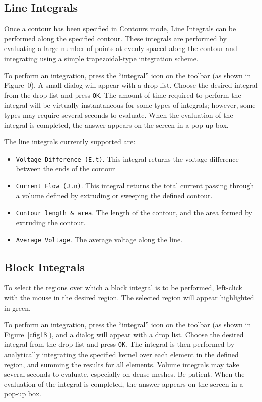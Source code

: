 \subsection{Line Integrals}

Once a contour has been specified in Contours mode, Line Integrals can be
performed along the specified contour. These integrals are performed by
evaluating a large number of points at evenly spaced along the contour and
integrating using a simple trapezoidal-type integration scheme.

To perform an integration, press the ``integral'' icon on the
toolbar (as shown in Figure~0). A small dialog will appear with a
drop list. Choose the desired integral from the drop list and press
\texttt{OK}. The amount of time required to perform the integral
will be virtually instantaneous for some types of integrals;
however, some types may require several seconds to evaluate. When
the evaluation of the integral is completed, the answer appears on
the screen in a pop-up box.

The line integrals currently supported are:

\begin{itemize}
\item \texttt{Voltage Difference (E.t)}. This integral returns the 
voltage difference between the ends of the contour

\item \texttt{Current Flow (J.n)}. This integral returns the total current passing through
a volume defined by extruding or sweeping the defined contour.

\item \texttt{Contour length \& area}. The length of the contour, and the area formed by
extruding the contour.

\item \texttt{Average Voltage}. The average voltage along the line.
\end{itemize}



\subsection{Block Integrals}

To select the regions over which a block integral is to be performed,
left-click with the mouse in the desired region. The selected region will
appear highlighted in green.

To perform an integration, press the ``integral'' icon on the
toolbar (as shown in Figure~\ref{cfig18}), and a dialog will appear
with a drop list. Choose the desired integral from the drop list
and press \texttt{OK}. The integral is then performed by
analytically integrating the specified kernel over each element in
the defined region, and summing the results for all elements.
Volume integrals may take several seconds to evaluate, especially
on dense meshes. Be patient. When the evaluation of the integral is
completed, the answer appears on the screen in a pop-up box.

